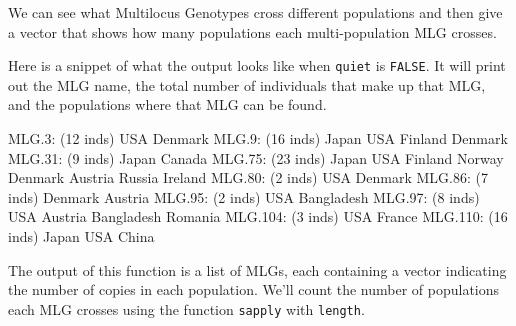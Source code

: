 \documentclass[letterpaper]{article}
\begin{document}
We can see what Multilocus Genotypes cross different populations and then give a vector that shows how many populations each multi-population MLG crosses.
\begin{Schunk}
\end{Schunk}
Here is a snippet of what the output looks like when \texttt{quiet} is \texttt{FALSE}. It will print out the MLG name, the total number of individuals that make up that MLG, and the populations where that MLG can be found.
\begin{Schunk}
\begin{Soutput}
MLG.3: (12 inds) USA Denmark
MLG.9: (16 inds) Japan USA Finland Denmark
MLG.31: (9 inds) Japan Canada
MLG.75: (23 inds) Japan USA Finland Norway Denmark Austria Russia Ireland
MLG.80: (2 inds) USA Denmark
MLG.86: (7 inds) Denmark Austria
MLG.95: (2 inds) USA Bangladesh
MLG.97: (8 inds) USA Austria Bangladesh Romania
MLG.104: (3 inds) USA France
MLG.110: (16 inds) Japan USA China
\end{Soutput}
\end{Schunk}
The output of this function is a list of MLGs, each containing a vector indicating the number of copies in each population. We'll count the number of populations each MLG crosses using the function \texttt{sapply} with \texttt{length}.
\end{document}
